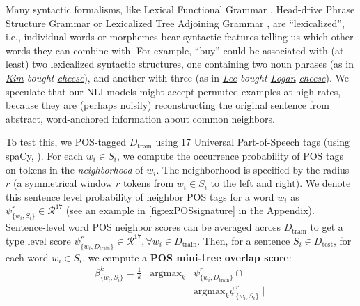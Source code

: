 \documentclass[11pt,a4paper]{article}
\newcommand{\PermAcc}{Permutation Acceptance} %
\begin{document}

Many syntactic formalisms, like Lexical Functional Grammar \citep[LFG]{kaplan-bresnan-1995-formal, bresnan-etal-2015-lexical}, Head-drive Phrase Structure Grammar \citep[HPSG]{pollard-sag-1994-head} or Lexicalized Tree Adjoining Grammar \citep[LTAG]{schabes-etal-1988-parsing, abeille-1990-lexical}, are ``lexicalized'', i.e., individual words or morphemes bear syntactic features telling us which other words they can combine with. For example, ``buy'' could be associated with (at least) two lexicalized syntactic structures, one containing two noun phrases (as in \textit{\underline{Kim} bought \underline{cheese}}), and another with three (as in \textit{\underline{Lee} bought \underline{Logan} \underline{cheese}}). %
We speculate that our NLI models might accept permuted examples at high rates, %
because they are (perhaps noisily) reconstructing the original sentence from abstract, word-anchored information about common neighbors. 

To test this, we POS-tagged $D_{\text{train}}$ using 17 Universal Part-of-Speech tags (using spaCy, \citealt{spacy2}). %
For each $w_i \in S_i$, we compute the occurrence probability of POS tags on tokens in the \textit{neighborhood} of $w_i$. The neighborhood is specified by the radius $r$ (a symmetrical window $r$ tokens from $w_i \in S_i$ to the left and right). We denote this sentence level probability of neighbor POS tags for a word $w_i$ as $\psi^r_{\{w_i, S_i\}} \in \mathcal{R}^{17}$ (see an example in \autoref{fig:exPOSsignature} in the Appendix). Sentence-level word POS neighbor scores can be averaged across $ D_{\text{train}}$ to get a type level score $\psi^r_{\{w_i, D_{\text{train}}\}} \in \mathcal{R}^{17}, \forall w_i \in D_{\text{train}}$.  Then, for a sentence $S_i \in D_{\text{test}}$, for each word $w_i \in S_i$, we compute a \textbf{POS mini-tree overlap score}:
\begin{equation} %
\begin{split}
\beta^k_{\{w_i,S_i\}} =
\frac{1}{k} \mid \text{argmax}_k &\psi^r_{\{w_i, D_{\text{train}}\}} \cap \\ &\text{argmax}_k\psi^r_{\{w_i, S_i\}} \mid
\end{split}
\end{equation}
\end{document}
